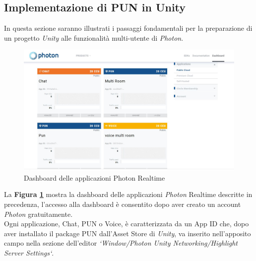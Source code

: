 \subsection{Implementazione di PUN in Unity}
In questa sezione saranno illustrati i passaggi fondamentali per la preparazione di un progetto \textit{Unity} alle funzionalità multi-utente di \textit{Photon}.
\begin{figure}[H]
    \centering
    \includegraphics[scale = 0.3]{Immagini/Sitophoton.jpg}
    \caption{Dashboard delle applicazioni Photon Realtime}
    \label{fig:3.12}
\end{figure}
\hspace{-0.6cm}La \textbf{Figura \ref{fig:3.12}} mostra la dashboard delle applicazioni \textit{Photon} Realtime descritte in precedenza, l'accesso alla dashboard è consentito dopo aver creato un account \textit{Photon} gratuitamente.
\\Ogni applicazione, Chat, PUN o Voice, è caratterizzata da un App ID che, dopo aver installato il package PUN
dall'Asset Store di \textit{Unity}, va inserito nell'apposito campo nella sezione dell'editor \textit{`Window/Photon Unity Networking/Highlight Server Settings`}.
